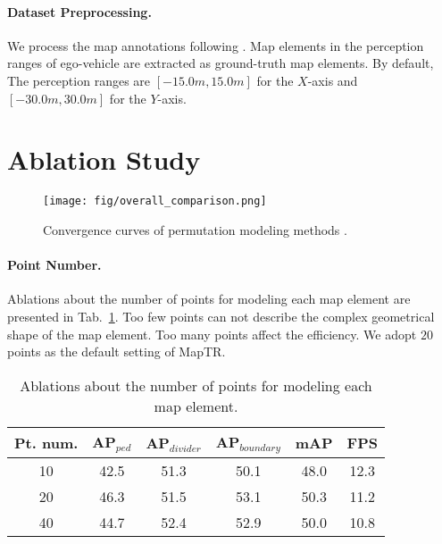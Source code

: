 \documentclass{article} \usepackage{iclr2023_conference,times}
\begin{document}
\paragraph{Dataset Preprocessing.}
We process the map annotations following \cite{vectormapnet, hdmapnet}. Map elements in the perception ranges of ego-vehicle are extracted as ground-truth map elements. By default, The perception ranges are $[-15.0m, 15.0m]$ for the $X$-axis and $[-30.0m, 30.0m]$ for the $Y$-axis.

\section{Ablation Study}
\label{sec:more_ablation}

\begin{figure}[h!]
    \begin{center}
    \texttt{[image: fig/overall\_comparison.png]}
    \end{center}
    \vspace*{-0.3cm}
    \caption{Convergence curves of permutation modeling methods .}
    \label{fig:stablization}
\end{figure}


\paragraph{Point Number.}
Ablations about the number of points for modeling each map element are presented in Tab.~\ref{tab:point-number}. Too few points can not describe the complex geometrical shape of the map element. Too many points affect the efficiency. We adopt $20$ points as the default setting of MapTR.

\begin{table}[ht]
\begin{center}
\begin{tabular}{c|ccc|cc}
\hline
\rowcolor{Gray}
Pt. num. & AP$_{\textit{ped}}$ & AP$_{\textit{divider}}$ & AP$_{\textit{boundary}}$ &mAP & FPS  \\
\toprule
10        &42.5&51.3&50.1& 48.0  & 12.3 \\
20  &\cellcolor{blue!10}46.3&\cellcolor{blue!10}51.5&\cellcolor{blue!10}53.1&\cellcolor{blue!10}50.3&\cellcolor{blue!10}11.2\\
40 &44.7&52.4&52.9  &50.0 & 10.8\\
\bottomrule
\end{tabular}
\end{center}
\vspace*{-0.45cm}
\caption{Ablations about the number of points for modeling each map element.}
\label{tab:point-number}
\vspace*{-0.35cm}
\end{table}
\end{document}
